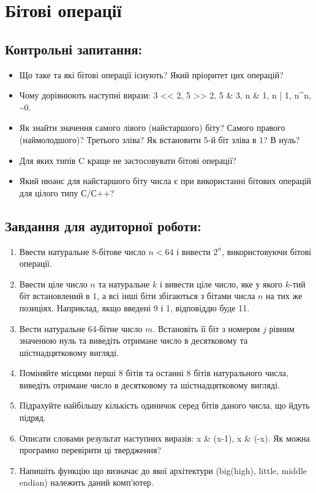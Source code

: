 \documentclass[a5paper,titlepage,openany,twoside,
]
{book_unv}%
\begin{document}
\chapter{Бітові операції }
%

\section{Контрольні запитання:}
\begin{itemize}
\item
  Що таке та які бітові операції існують? Який пріоритет цих операцій?
\item
  Чому дорівнюють наступні вирази:
  3 \textless{}\textless{} 2, 5 \textgreater{}\textgreater{} 2, 5 \& 3, 
n \& 1, n | 1, n\textasciicircum{}n, \textasciitilde{}0.
\item
  Як знайти значення самого лівого (найстаршого) біту? 
Самого правого (наймолодшого)? Третього зліва?
  Як встановити 5-й біт зліва в 1? В нуль?
\item
  Для яких типів C краще не застосовувати бітові операції?
\item
  Який нюанс для найстаршого біту числа є при використанні бітових операцій для
  цілого типу С/С++?
\end{itemize}

\section{Завдання для аудиторної роботи:}

\begin{enumerate}
\def\labelenumi{\arabic{enumi})}
\item
  Ввести натуральне 8-бітове число $n<64$ і вивести $2^{n}$, використовуючи бітові операції.
\item
  Ввести ціле число $n$ та натуральне $k$ і вивести ціле число, яке у якого
  $k$-тий біт встановлений в 1, а всі інші біти збігаються з бітами числа $n$
  на тих же позиціях. Наприклад, якщо введені 9 і 1, відповіддю буде 11.
\item
  Вести натуральне 64-бітне число $m$. Встановіть її біт
  з номером $j$ рівним значенюю нуль та виведіть отримане число в десятковому та
  шістнадцятковому вигляді.
\item
  Поміняйте місцями перші 8 бітів та останні 8 бітів натурального числа,
  виведіть отримане число в десятковому та шістнадцятковому вигляді.
\item
  Підрахуйте найбільшу кількість одиничок серед бітів даного числа, що
  йдуть підряд.
\item
  Описати словами результат наступних виразів: x \& (x-1), x \& (-x). 
Як можна програмно перевірити ці твердження?
\item
  Напишіть функцію що визначає до якої архітектури (big(high), little, middle
  endian) належить даний комп'ютер.
\end{enumerate}
\end{document}
